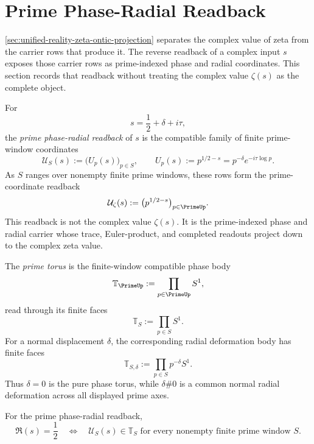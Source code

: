 \section{Prime Phase-Radial Readback}
\label{sec:unified-reality-prime-phase-radial-readback}

\autoref{sec:unified-reality-zeta-ontic-projection} separates the
complex value of zeta from the carrier rows that produce it.  The
reverse readback of a complex input $s$ exposes those carrier rows as
prime-indexed phase and radial coordinates.  This section records that
readback without treating the complex value $\zeta(s)$ as the complete
object.

\begin{definition}
\label{def:unified-reality-prime-phase-radial-readback}
For
$$
s=\frac12+\delta+i\tau,
$$
the \emph{prime phase-radial readback} of $s$ is the compatible family
of finite prime-window coordinates
$$
\mathcal U_S(s)
:=
\bigl(U_p(s)\bigr)_{p\in S},
\qquad
U_p(s):=p^{1/2-s}=p^{-\delta}e^{-i\tau\log p}.
$$
As $S$ ranges over nonempty finite prime windows, these rows form the
prime-coordinate readback
$$
\mathcal U_{\zeta}(s)
:=
\bigl(p^{1/2-s}\bigr)_{p\in\PrimeUp}.
$$
This readback is not the complex value $\zeta(s)$.  It is the
prime-indexed phase and radial carrier whose trace, Euler-product, and
completed readouts project down to the complex zeta value.
\end{definition}

\begin{definition}
\label{def:unified-reality-prime-torus-radial-deformation-body}
The \emph{prime torus} is the finite-window compatible phase body
$$
\mathbb T_{\PrimeUp}
:=
\prod_{p\in\PrimeUp}S^1,
$$
read through its finite faces
$$
\mathbb T_S:=\prod_{p\in S}S^1.
$$
For a normal displacement $\delta$, the corresponding radial deformation
body has finite faces
$$
\mathbb T_{S,\delta}
:=
\prod_{p\in S}p^{-\delta}S^1.
$$
Thus $\delta=0$ is the pure phase torus, while $\delta\#0$ is a common
normal radial deformation across all displayed prime axes.
\end{definition}

\begin{theorem}
\label{thm:unified-reality-critical-surface-prime-torus}
For the prime phase-radial readback,
$$
\Re(s)=\frac12
\quad\Longleftrightarrow\quad
\mathcal U_S(s)\in\mathbb T_S
\text{ for every nonempty finite prime window }S.
$$
\end{theorem}

